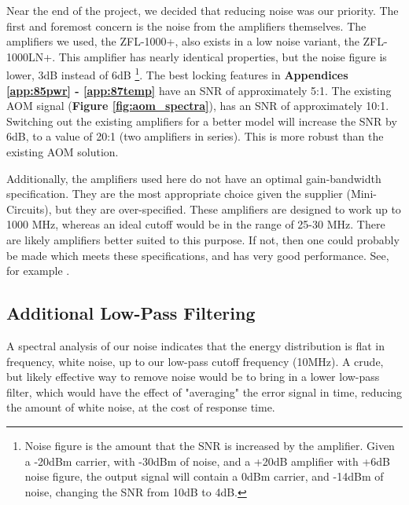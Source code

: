 Near the end of the project, we decided that reducing noise was our priority.  The first and foremost concern is the noise from the amplifiers themselves.  The amplifiers we used, the ZFL-1000+, also exists in a low noise variant, the ZFL-1000LN+.  This amplifier has nearly identical properties, but the noise figure is lower, 3dB instead of 6dB \footnote{Noise figure is the amount that the SNR is increased by the amplifier.  Given a -20dBm carrier, with -30dBm of noise, and a +20dB amplifier with +6dB noise figure, the output signal will contain a 0dBm carrier, and -14dBm of noise, changing the SNR from 10dB to 4dB.}. The best locking features in \textbf{Appendices \ref{app:85pwr} - \ref{app:87temp}} have an SNR of approximately 5:1. The existing AOM signal (\textbf{Figure \ref{fig:aom_spectra}}), has an SNR of approximately 10:1. Switching out the existing amplifiers for a better model will increase the SNR by 6dB, to a value of 20:1 (two amplifiers in series). This is more robust than the existing AOM solution.

Additionally, the amplifiers used here do not have an optimal gain-bandwidth specification.  They are the most appropriate choice given the supplier (Mini-Circuits), but they are over-specified.  These amplifiers are designed to work up to 1000 MHz, whereas an ideal cutoff would be in the range of 25-30 MHz.  There are likely amplifiers better suited to this purpose.  If not, then one could probably be made which meets these specifications, and has very good performance.  See, for example \cite{ti_amps}.

\subsection{Additional Low-Pass Filtering}

A spectral analysis of our noise indicates that the energy distribution is flat in frequency, white noise, up to our low-pass cutoff frequency (10MHz).  A crude, but likely effective way to remove noise would be to bring in a lower low-pass filter, which would have the effect of "averaging" the error signal in time, reducing the amount of white noise, at the cost of response time.



